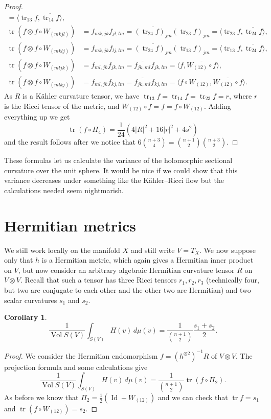 \documentclass[10pt,a4paper]{amsart}
\newtheorem{coro}[theo]{Corollary}
\theoremstyle{definition}
\def\ov#1{\overline{#1}}
\def\d{\,d}
\DeclareMathOperator{\id}{Id}
\DeclareMathOperator{\tr}{tr}
\DeclareMathOperator{\Vol}{Vol}
\begin{document}
\begin{proof}
\begin{align*}
= \langle \tr_{13} f, \ov{\tr_{14} f} \rangle,
\\
\tr(f \otimes f \circ W_{(mkjl)})
&= f_{mk,jk} f_{jl,lm}
= \ov{(\tr_{24} f)_{jm}} (\tr_{23} f)_{jm}
= \langle \tr_{23} f, \ov{\tr_{24} f} \rangle,
\\
\tr(f \otimes f \circ W_{(mklj)})
&= f_{mk,jk} f_{lj,lm}
= \ov{(\tr_{24} f)_{jm}} (\tr_{13} f)_{jm}
= \langle \tr_{13} f, \ov{\tr_{24} f} \rangle,
\\
\tr(f \otimes f \circ W_{(mljk)})
&= f_{ml,jk} f_{jk,lm}
= \ov{f_{jk,ml}} f_{jk,lm}
= \langle f, \ov{W_{(12)} \circ f} \rangle,
\\
\tr(f \otimes f \circ W_{(mlkj)})
&= f_{ml,jk} f_{kj,lm}
= \ov{f_{jk,ml}} f_{kj,lm}
= \langle f \circ W_{(12)}, \ov{W_{(12)} \circ f} \rangle.
\end{align*}
As $R$ is a K\"ahler curvature tensor, we have $\tr_{13} f = \tr_{14} f =
\tr_{23} f = r$,
where $r$ is
the Ricci tensor of the metric, and $W_{(12)} \circ f = f = f \circ W_{(12)}$.
Adding everything up we get
$$
\tr(f \circ \Pi_4)
= \frac{1}{24} (4|R|^2 + 16 |r|^2 + 4 s^2)
$$
and the result follows after we notice that
\(
6 \binom{n+3}{4} = \binom{n+1}{2} \binom{n+3}{2}
\).
\end{proof}

These formulas let us calculate the variance of the holomorphic sectional
curvature over the unit sphere.
It would be nice if we could show that this variance decreases under something
like the K\"ahler--Ricci flow but the calculations needed seem nightmarish.


\section{Hermitian metrics}

We still work locally on the manifold $X$ and still write $V = T_X$.
We now suppose only that $h$ is a Hermitian metric, which again gives a
Hermitian inner product on $V$, but now consider an arbitrary algebraic
Hermitian curvature tensor $R$ on $V \otimes V$.
Recall that such a tensor has three Ricci tensors $r_1, r_2, r_3$ (technically
four, but two are conjugate to each other and the other two are Hermitian) and two
scalar curvatures $s_1$ and $s_2$.

\begin{coro}
$$
\frac{1}{\Vol S(V)} \int_{S(V)}
\!\!\!
H(v)  \d\mu(v)
= \frac{1}{\binom{n+1}{2}} \frac{s_1 + s_2}{2} .
$$
\end{coro}


\begin{proof}
We consider the Hermitian endomorphism $f = (h^{\otimes 2})^{-1} R$ of $V
\otimes V$.
The projection formula and some calculations give
$$
\frac{1}{\Vol S(V)} \int_{S(V)}
\!\!\!
H(v)  \d\mu(v)
= \frac{1}{\binom{n+1}{2}} \tr(f \circ \Pi_2).
$$
As before we know that $\Pi_2 = \frac12(\id + W_{(12)})$
and we can check that $\tr f = s_1$ and $\tr(f \circ W_{(12)}) = s_2$.
\end{proof}
\end{document}
